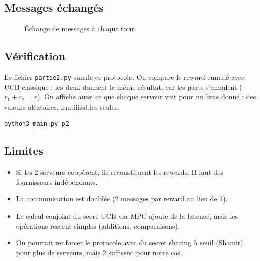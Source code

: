 \documentclass[12pt,a4paper]{article}
\begin{document}
\subsection{Messages échangés}

\begin{figure}[H]
\centering
{}
\caption{Échange de messages à chaque tour.}
\label{fig:protocol}
\end{figure}

\subsection{Vérification}

Le fichier \texttt{partie2.py} simule ce protocole. On compare le reward cumulé avec UCB classique : les deux donnent le même résultat, car les parts s'annulent ($r_1 + r_2 = r$). On affiche aussi ce que chaque serveur voit pour un bras donné : des valeurs aléatoires, inutilisables seules.

\begin{lstlisting}[language=bash]
python3 main.py p2
\end{lstlisting}

\subsection{Limites}

\begin{itemize}
    \item Si les 2 serveurs coopèrent, ils reconstituent les rewards. Il faut des fournisseurs indépendants.
    \item La communication est doublée (2 messages par reward au lieu de 1).
    \item Le calcul conjoint du score UCB via MPC ajoute de la latence, mais les opérations restent simples (additions, comparaisons).
    \item On pourrait renforcer le protocole avec du secret sharing à seuil (Shamir) pour plus de serveurs, mais 2 suffisent pour notre cas.
\end{itemize}
\end{document}
